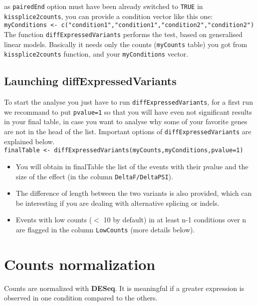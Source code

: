 \documentclass[english, a4paper, 12pt]{article}
\begin{document}
as \texttt{pairedEnd} option must have been already switched to \texttt{TRUE} in \texttt{kissplice2counts}, you can provide a condition vector like this one:\\ 

\texttt{myConditions <- c("condition1","condition1","condition2","condition2")}\\

The function \texttt{diffExpressedVariants} performs the test, based on generalised linear models. Basically it needs only the counts (\texttt{myCounts} table) you got from \texttt{kissplice2counts} function, and your \texttt{myConditions} vector.

\subsection{Launching diffExpressedVariants}
To start the analyse you just have to run \texttt{diffExpressedVariants}, for a first run we recommand to put \texttt{pvalue=1} so that you will have even not significant results in your final table, in case you want to analyse why some of your favorite genes are not in the head of the list. Important options of \texttt{diffExpressedVariants} are explained below.\\

\texttt{finalTable <- diffExpressedVariants(myCounts,myConditions,pvalue=1)}
\begin{itemize}
 \item You will obtain in finalTable the list of the events with their pvalue and the size of the effect (in the column \texttt{DeltaF/DeltaPSI}). 
  \item The difference of length between the two variants is also provided, which can be interesting if you are dealing with alternative splicing or indels.
 \item Events with low counts ($<$ 10 by default) in at least n-1 conditions over n are flagged in the column \texttt{LowCounts} (more details below).
\end{itemize}





\section{Counts normalization}
Counts are normalized with \textbf{DESeq}. It is meaningful if a greater expression is observed in one condition compared to the others.
\end{document}
